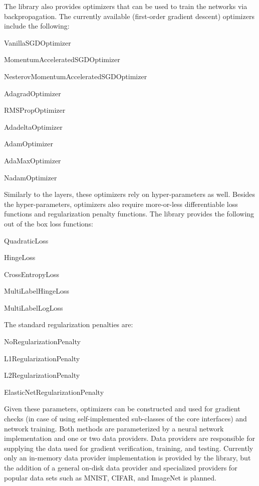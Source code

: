 The library also provides optimizers that can be used to train the networks via backpropagation. The currently available (first-\/order gradient descent) optimizers include the following\+:
\begin{DoxyItemize}
\item Vanilla\+S\+G\+D\+Optimizer
\item Momentum\+Accelerated\+S\+G\+D\+Optimizer
\item Nesterov\+Momentum\+Accelerated\+S\+G\+D\+Optimizer
\item Adagrad\+Optimizer
\item R\+M\+S\+Prop\+Optimizer
\item Adadelta\+Optimizer
\item Adam\+Optimizer
\item Ada\+Max\+Optimizer
\item Nadam\+Optimizer
\end{DoxyItemize}

Similarly to the layers, these optimizers rely on hyper-\/parameters as well. Besides the hyper-\/parameters, optimizers also require more-\/or-\/less differentiable loss functions and regularization penalty functions. The library provides the following out of the box loss functions\+:
\begin{DoxyItemize}
\item Quadratic\+Loss
\item Hinge\+Loss
\item Cross\+Entropy\+Loss
\item Multi\+Label\+Hinge\+Loss
\item Multi\+Label\+Log\+Loss
\end{DoxyItemize}

The standard regularization penalties are\+:
\begin{DoxyItemize}
\item No\+Regularization\+Penalty
\item L1\+Regularization\+Penalty
\item L2\+Regularization\+Penalty
\item Elastic\+Net\+Regularization\+Penalty
\end{DoxyItemize}

Given these parameters, optimizers can be constructed and used for gradient checks (in case of using self-\/implemented sub-\/classes of the core interfaces) and network training. Both methods are parameterized by a neural network implementation and one or two data providers. Data providers are responsible for supplying the data used for gradient verification, training, and testing. Currently only an in-\/memory data provider implementation is provided by the library, but the addition of a general on-\/disk data provider and specialized providers for popular data sets such as M\+N\+I\+ST, C\+I\+F\+AR, and Image\+Net is planned.

